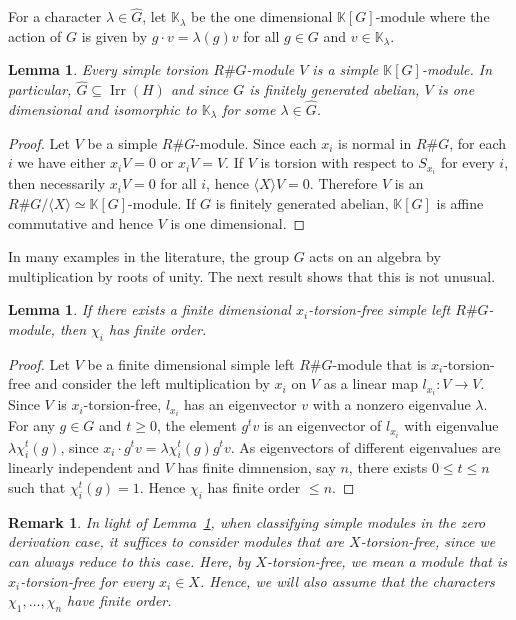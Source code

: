 \documentclass[11pt, twoside]{amsart}
\newtheorem{lemma}[theorem]{Lemma}
\newtheorem{remark}[theorem]{Remark}
\theoremstyle{definition}
\newcommand{\KK}{\mathbb{K}}
\newcommand{\Irr}{\operatorname{Irr}}
\begin{document}
For a character $\lambda \in \widehat{G}$, let $\KK_\lambda$ be the one dimensional $\KK[G]$-module where the action of $G$ is given by $g\cdot v = \lambda(g)v$ for all $g \in G$ and $v \in \KK_\lambda$.
%
\begin{lemma}\label{lemma:torsion modules in zero derivation case}
    Every simple torsion $R\# G$-module $V$ is a simple $\KK[G]$-module. In particular, $\widehat{G}\subseteq \Irr(H)$ and since $G$ is finitely generated abelian, $V$ is one dimensional and isomorphic to $\KK_\lambda$ for some $\lambda \in \widehat{G}$.
\end{lemma}
%
\begin{proof}
    Let $V$ be a simple $R\# G$-module. Since each $x_i$ is normal in $R\#G$, for each $i$ we have either $x_iV=0$ or $x_iV=V$. If $V$ is torsion with respect to $S_{x_i}$ for every $i$, then necessarily $x_iV=0$ for all $i$, hence $\langle X\rangle V=0$. Therefore $V$ is an $R\#G/\langle X\rangle \simeq \KK[G]$-module. If $G$ is finitely generated abelian, $\KK[G]$ is affine commutative and hence $V$ is one dimensional. 
\end{proof}
%
In many examples in the literature, the group $G$ acts on an algebra by multiplication by roots of unity. The next result shows that this is not unusual.
%
\begin{lemma}
    If there exists a finite dimensional $x_i$-torsion-free simple left $R\# G$-module, then $\chi_i$ has finite order.
\end{lemma}
%
\begin{proof}
    Let $V$ be a finite dimensional simple left $R\# G$-module that is $x_i$-torsion-free and consider the left multiplication by $x_i$ on $V$ as a linear map $l_{x_i} :V \to V$. Since $V$ is $x_i$-torsion-free, $l_{x_i}$ has an eigenvector $v$ with a nonzero eigenvalue $\lambda$.  For any $g\in G$ and $t\geq 0$, the element $g^tv$ is an eigenvector of $l_{x_i}$ with eigenvalue $\lambda \chi_{i}^{t}(g)$, since  $x_i \cdot g^t v = \lambda \chi_{i}^{t}(g)g^t v$. As eigenvectors of different eigenvalues are linearly independent and $V$ has finite dimnension, say $n$, there exists $0\leq t \leq n$ such that $\chi_{i}^{t}(g)=1$. Hence $\chi_{i}$ has finite order $\leq n$.
\end{proof}
%
\begin{remark}
    In light of Lemma~\ref{lemma:torsion modules in zero derivation case}, when classifying simple modules in the zero derivation case, it suffices to consider modules that are $X$-torsion-free, since we can always reduce to this case. Here, by $X$-torsion-free, we mean a module that is $x_i$-torsion-free for every $x_i \in X$. Hence, we will also assume that the characters $\chi_1, \ldots, \chi_n$ have finite order.
\end{remark}
\end{document}
